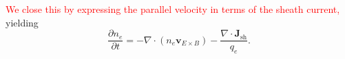 \documentclass{article}
\begin{document}
\textcolor{red}{We close this by expressing the parallel velocity in terms of the sheath current,} yielding
%
\begin{equation}
    \frac{\partial n_e}{\partial t} = - \nabla \cdot (n_e \bm{v}_{E \times B}) - \frac{\nabla \cdot \bm{J}_\text{sh}}{q_e} .
\end{equation}



\end{document}
